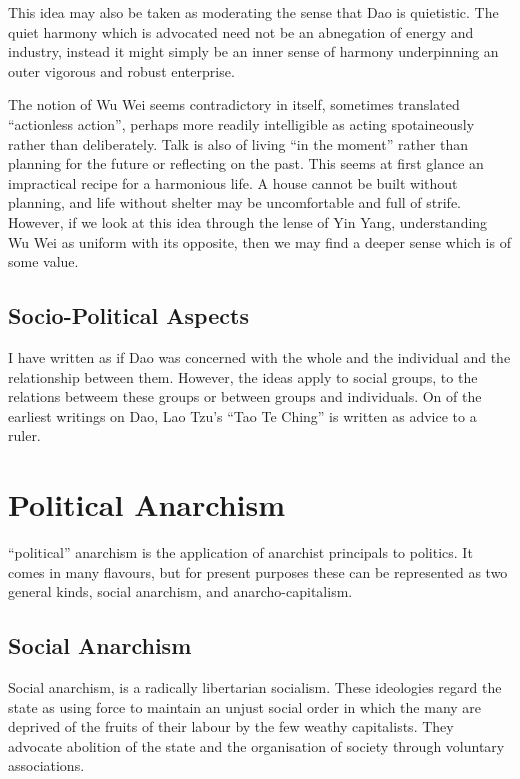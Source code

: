 \documentclass[10pt,titlepage]{article}
\begin{document}
This idea may also be taken as moderating the sense that Dao is quietistic.
The quiet harmony which is advocated need not be an abnegation of energy and industry, instead it might simply be an inner sense of harmony underpinning an outer vigorous and robust enterprise.

The notion of Wu Wei seems contradictory in itself, sometimes translated ``actionless action'', perhaps more readily intelligible as acting spotaineously rather than deliberately.
Talk is also of living ``in the moment'' rather than planning for the future or reflecting on the past.
This seems at first glance an impractical recipe for a harmonious life.
A house cannot be built without planning, and life without shelter may be uncomfortable and full of strife.
However, if we look at this idea through the lense of Yin Yang, understanding Wu Wei as uniform with its opposite, then we may find a deeper sense which is of some value.

\subsection{Socio-Political Aspects}

I have written as if Dao was concerned with the whole and the individual and the relationship between them.
However, the ideas apply to social groups, to the relations betweem these groups or between groups and individuals.
On of the earliest writings on Dao, Lao Tzu's ``Tao Te Ching'' is written as advice to a ruler.

\section{Political Anarchism}

``political'' anarchism is the application of anarchist principals to politics.
It comes in many flavours, but for present purposes these can be represented as two general kinds, social anarchism, and anarcho-capitalism.

\subsection{Social Anarchism}

Social anarchism, is a radically libertarian socialism.
These ideologies regard the state as using force to maintain an unjust social order in which the many are deprived of the fruits of their labour by the few weathy capitalists.
They advocate abolition of the state and the organisation of society through voluntary associations.
\end{document}
